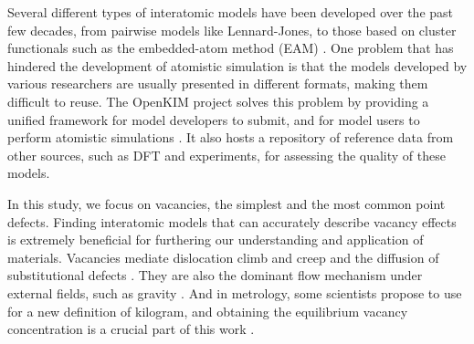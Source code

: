 \documentclass[%
 reprint,
 nofootinbib,
 amsmath,amssymb,
 aps,
]{revtex4-1}
\begin{document}
Several different types of interatomic models have been developed over the past few decades, from pairwise models like Lennard-Jones, to those based on cluster functionals such as the embedded-atom method (EAM) \cite{daw1993embedded, daw1984embedded}.
One problem that has hindered the development of atomistic simulation is that the models developed by various researchers are usually presented in different formats, making them difficult to reuse.
The OpenKIM project \cite{bierbaum2014openkim, openkim2016} solves this problem by providing a unified framework for model developers to submit, and for model users to perform atomistic simulations \cite{tadmor2011potential}.
It also hosts a repository of reference data from other sources, such as DFT and experiments, for assessing the quality of these models.

In this study, we focus on vacancies, the simplest and the most common point defects.
Finding interatomic models that can accurately describe vacancy effects is extremely beneficial for furthering our understanding and application of materials.
Vacancies mediate dislocation climb and creep \cite{weertman1955theory} and the diffusion of substitutional defects \cite{fahey1989point}.
They are also the dominant flow mechanism under external fields, such as gravity \cite{sethna2014flow}.
And in metrology, some scientists propose to use  for a new definition of kilogram, and obtaining the equilibrium vacancy concentration is a crucial part of this work \cite{andreas2011counting}.

\end{document}
